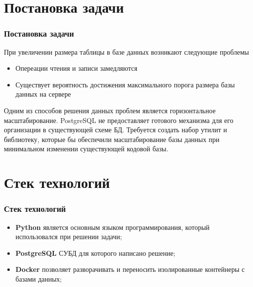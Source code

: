 \documentclass[pdf, hyperref={unicode}, aspectratio=169]{beamer}
\begin{document}
\section{Постановка задачи}
\begin{frame}
	\frametitle{Постановка задачи}
	
	При увеличении размера таблицы в базе данных возникают следующие проблемы
	
	\begin{itemize}
		\item Опереации чтения и записи замедляются
		\item Существует вероятность достижения максимального порога размера базы данных на сервере
	\end{itemize}
	Одним из способов решения данных проблем является горизонтальное масштабирование. PostgreSQL не предоставляет готового механизма для его организации в существующей схеме БД. Требуется создать набор утилит и библиотеку, которые бы обеспечили масштабирование базы данных при минимальном изменении существующей кодовой базы.
\end{frame}


\section{Стек технологий}
\begin{frame}
	\frametitle{Стек технологий}
	
	\begin{itemize}
		\item \textbf{Python} является основным языком программирования, который использовался при решении задачи;
		\item \textbf{PostgreSQL} СУБД для которого написано решение;
		\item \textbf{Docker} позволяет разворачивать и переносить изолированные контейнеры с базами данных;
	\end{itemize}
\end{frame}
\end{document}
